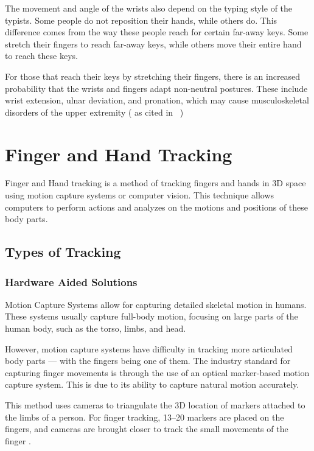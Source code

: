 \documentclass{report}
\begin{document}
The movement and angle of the wrists also depend on the typing style of the
typists. Some people do not reposition their hands, while others do. This
difference comes from the way these people reach for certain far-away keys. Some
stretch their fingers to reach far-away keys, while others move their entire
hand to reach these keys.

For those that reach their keys by stretching their fingers, there is an
increased probability that the wrists and fingers adapt non-neutral postures.
These include wrist extension, ulnar deviation, and pronation, which may cause
musculoskeletal disorders of the upper extremity (\cite{marklin1999} as cited in
~\cite{baker2007})

\section{Finger and Hand Tracking}
Finger and Hand tracking is a method of tracking fingers and hands in 3D space
using motion capture systems or computer vision. This technique allows computers
to perform actions and analyzes on the motions and positions of these body
parts.


\subsection{Types of Tracking}

\subsubsection{Hardware Aided Solutions}

Motion Capture Systems allow for capturing detailed skeletal motion in humans.
These systems usually capture full-body motion, focusing on large parts of the
human body, such as the torso, limbs, and head.

However, motion capture systems have difficulty in tracking more articulated
body parts --- with the fingers being one of them. The industry standard for
capturing finger movements is through the use of an optical marker-based motion
capture system. This is due to its ability to capture natural motion accurately.

This method uses cameras to triangulate the 3D location of markers attached to
the limbs of a person. For finger tracking, 13--20 markers are placed on the
fingers, and cameras are brought closer to track the small movements of the
finger \parencite{wheatland2015}.
\end{document}
